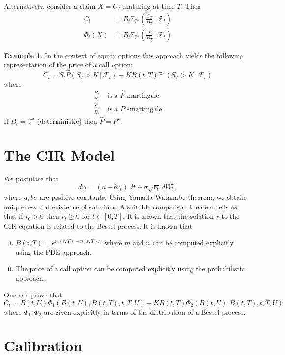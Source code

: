 \documentclass[10pt, oneside, reqno]{amsbook}
\theoremstyle{plain}%
\theoremstyle{definition}
\newtheorem{exmp}[thm]{Example}
\theoremstyle{remark}
\newcommand{\given}{ \, | \,}
\newcommand{\sigf}{\mathcal{F}}
\newcommand{\E}{\mathbb{E}}
\renewcommand{\P}{\mathbb{P}}
\numberwithin{equation}{chapter}
\begin{document}
Alternatively, consider a claim $X = C_T$ maturing at time $T$.  Then \begin{align*}
	C_t &= B_t \E_{\P^\star} \left( \frac{C_T}{B_T} \given \sigf_t \right) \\
	\Phi_t(X) &= B_t \E_{\P^\star} \left( \frac{X}{B_T} \given \sigf_t \right)
\end{align*}
\begin{exmp}
	In the context of equity options this approach yields the following representation of the price of a call option: \[
		C_t = S_t \hat P \left(S_T > K \given \sigf_t \right) - K B(t, T) \P^\star \left( S_T > K \given \sigf_t \right)
	\] 
	where \begin{align*}
		\frac{B_t}{S_t} &\text{ is a $\hat P$-martingale} \\
		\frac{S_t}{B_t} &\text{ is a $P^\star$-martingale}
	\end{align*}  If $B_t = e^{rt}$ (deterministic) then $\hat P =  P^\star$.
\end{exmp}

\section{The CIR Model} %
\label{sub:the_cir}
We postulate that \[
	dr_t = (a- b r_t) \, dt + \sigma \sqrt{r_t} \, dW^\star_t,
\]  where $a, b \sigma$ are positive constants.  Using Yamada-Watanabe theorem, we obtain uniqueness and existence of solutions.  A suitable comparison theorem tells us that if $r_0 > 0$ then $r_t \geq 0$ for $ t \in [ 0, T]$.  It is known that the solution $r$ to the CIR equation is related to the Bessel process.  It is known that \begin{enumerate}[(i)]
	\item $B(t, T) = e^{m(t, T) - n(t, T) r_t}$ where $m$ and $n$ can be computed explicitly using the PDE approach.  
	\item The price of a call option can be computed explicitly using the probabilistic approach.
\end{enumerate} 

One can prove that \[
	C_t = B(t, U) \Phi_1(B(t, U), B(t, T), t, T, U) - K B(t, T) \Phi_2(B(t, U), B(t, T), t, T, U)
\] where $\Phi_1, \Phi_2$ are given explicitly in terms of the distribution of a Bessel process.

\section{Calibration} %
\label{sub:calibration}
\end{document}
